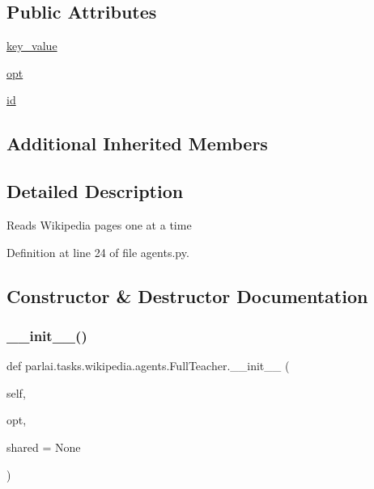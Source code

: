 \subsection*{Public Attributes}
\begin{DoxyCompactItemize}
\item 
\hyperlink{classparlai_1_1tasks_1_1wikipedia_1_1agents_1_1FullTeacher_ad868c50f3a789ce8f091605630b8f715}{key\+\_\+value}
\item 
\hyperlink{classparlai_1_1tasks_1_1wikipedia_1_1agents_1_1FullTeacher_aa4ceed492ea802e93be6cad4f5a7b322}{opt}
\item 
\hyperlink{classparlai_1_1tasks_1_1wikipedia_1_1agents_1_1FullTeacher_a336be0a2ec18a9d19fd58cc4031c30b6}{id}
\end{DoxyCompactItemize}
\subsection*{Additional Inherited Members}


\subsection{Detailed Description}
\begin{DoxyVerb}Reads Wikipedia pages one at a time
\end{DoxyVerb}
 

Definition at line 24 of file agents.\+py.



\subsection{Constructor \& Destructor Documentation}
\mbox{\label{classparlai_1_1tasks_1_1wikipedia_1_1agents_1_1FullTeacher_a51b594b0d89c482575edc4ada9e1edcb}} 
\subsubsection{\texorpdfstring{\+\_\+\+\_\+init\+\_\+\+\_\+()}{\_\_init\_\_()}}
{\footnotesize\ttfamily def parlai.\+tasks.\+wikipedia.\+agents.\+Full\+Teacher.\+\_\+\+\_\+init\+\_\+\+\_\+ (\begin{DoxyParamCaption}\item[{}]{self,  }\item[{}]{opt,  }\item[{}]{shared = {\ttfamily None} }\end{DoxyParamCaption})}



